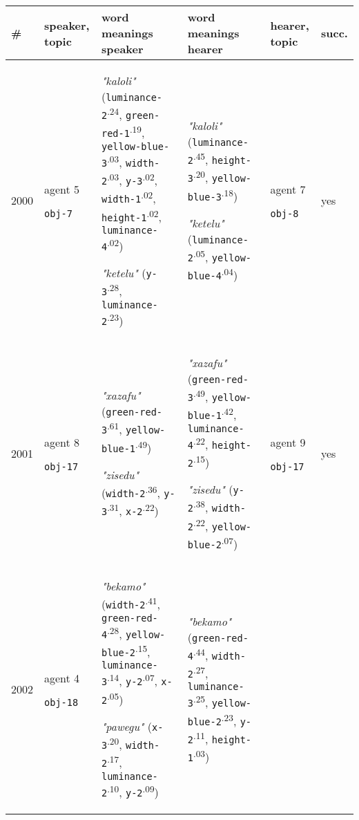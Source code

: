 
\renewcommand{\arraystretch}{1.5}{
  \begin{tabular}{@{}p{0.4cm}p{0.85cm}p{6.5cm}p{6.5cm}p{0.85cm}p{0.5cm}@{}}
  \# & speaker, topic & word meanings speaker & word meanings hearer & hearer, topic & succ. \\
  \hline



2000 & agent 5 

\texttt{obj-7} &\textit{"kaloli"} (\texttt{luminance-2}\textsuperscript{.24}, \texttt{green-red-1}\textsuperscript{.19}, \texttt{yellow-blue-3}\textsuperscript{.03}, \texttt{width-2}\textsuperscript{.03}, \texttt{y-3}\textsuperscript{.02}, \texttt{width-1}\textsuperscript{.02}, \texttt{height-1}\textsuperscript{.02}, \texttt{luminance-4}\textsuperscript{.02})

\textit{"ketelu"} (\texttt{y-3}\textsuperscript{.28}, \texttt{luminance-2}\textsuperscript{.23}) & \textit{"kaloli"} (\texttt{luminance-2}\textsuperscript{.45}, \texttt{height-3}\textsuperscript{.20}, \texttt{yellow-blue-3}\textsuperscript{.18})

\textit{"ketelu"} (\texttt{luminance-2}\textsuperscript{.05}, \texttt{yellow-blue-4}\textsuperscript{.04}) & agent 7 

 \texttt{obj-8} & yes \\
2001 & agent 8 

\texttt{obj-17} &\textit{"xazafu"} (\texttt{green-red-3}\textsuperscript{.61}, \texttt{yellow-blue-1}\textsuperscript{.49})

\textit{"zisedu"} (\texttt{width-2}\textsuperscript{.36}, \texttt{y-3}\textsuperscript{.31}, \texttt{x-2}\textsuperscript{.22}) & \textit{"xazafu"} (\texttt{green-red-3}\textsuperscript{.49}, \texttt{yellow-blue-1}\textsuperscript{.42}, \texttt{luminance-4}\textsuperscript{.22}, \texttt{height-2}\textsuperscript{.15})

\textit{"zisedu"} (\texttt{y-2}\textsuperscript{.38}, \texttt{width-2}\textsuperscript{.22}, \texttt{yellow-blue-2}\textsuperscript{.07}) & agent 9 

 \texttt{obj-17} & yes \\
2002 & agent 4 

\texttt{obj-18} &\textit{"bekamo"} (\texttt{width-2}\textsuperscript{.41}, \texttt{green-red-4}\textsuperscript{.28}, \texttt{yellow-blue-2}\textsuperscript{.15}, \texttt{luminance-3}\textsuperscript{.14}, \texttt{y-2}\textsuperscript{.07}, \texttt{x-2}\textsuperscript{.05})

\textit{"pawegu"} (\texttt{x-3}\textsuperscript{.20}, \texttt{width-2}\textsuperscript{.17}, \texttt{luminance-2}\textsuperscript{.10}, \texttt{y-2}\textsuperscript{.09}) & \textit{"bekamo"} (\texttt{green-red-4}\textsuperscript{.44}, \texttt{width-2}\textsuperscript{.27}, \texttt{luminance-3}\textsuperscript{.25}, \texttt{yellow-blue-2}\textsuperscript{.23}, \texttt{y-2}\textsuperscript{.11}, \texttt{height-1}\textsuperscript{.03})


\end{tabular}}
